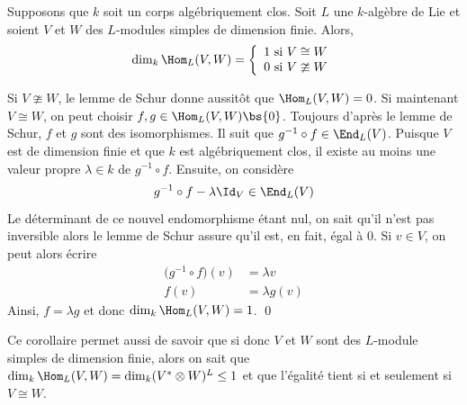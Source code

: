 \begin{Cor} \label{dimhom} Supposons que $k$ soit un corps algébriquement clos. Soit $L$ une $k$-algèbre de Lie et soient $V$ et $W$ des $L$-modules simples de dimension finie. Alors,
\begin{equation*}
\dim_k \Hom_L(V,W) = \left\{\begin{array}{c} 1 \text{ si } V \cong W\\ 0 \text{ si } V \ncong W\end{array}\right.
\end{equation*}
\begin{pre} Si $V \ncong W$, le lemme de Schur donne aussitôt que $\Hom_L(V,W) = 0$. Si maintenant $V \cong W$, on peut choisir $f,g \in \Hom_L(V,W)\bs\{0\}$. Toujours d'après le lemme de Schur, $f$ et $g$ sont des isomorphismes. Il suit que $g^{-1} \circ f \in \End_L(V)$. Puisque $V$ est de dimension finie et que $k$ est algébriquement clos, il existe au moins une valeur propre $\lambda \in k$ de $g^{-1} \circ f$. Ensuite, on considère 
$$ g^{-1} \circ f - \lambda \Id_V \in \End_L(V) $$
Le déterminant de ce nouvel endomorphisme étant nul, on sait qu'il n'est pas inversible alors le lemme de Schur assure qu'il est, en fait, égal à 0. Si $v \in V$, on peut alors écrire
\begin{align*}
\big(g^{-1} \circ f\big)(v) &= \lambda v\\
f(v) &=\lambda g(v)
\end{align*}
Ainsi, $f = \lambda g$ et donc $\dim_k \Hom_L(V,W) = 1$. \qed
\end{pre}
\end{Cor}

\begin{Rem} Ce corollaire permet aussi de savoir que si donc $V$ et $W$ sont des $L$-module simples de dimension finie, alors on sait que $\dim_k \Hom_L(V,W) = \dim_k (V^* \otimes W)^L \leq 1$ et que l'égalité tient si et seulement si $V \cong W$.
\end{Rem}


